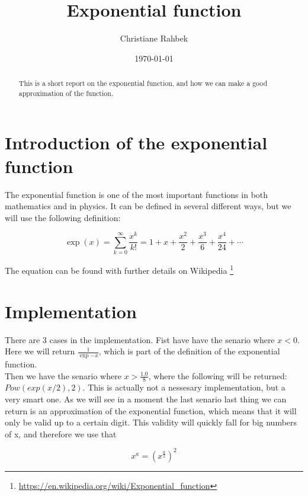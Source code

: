 \documentclass[twocolumn, a4paper]{article}
\begin{document}
\title{Exponential function}
\author{Christiane Rahbek}
\date{\today}

\maketitle

\begin{abstract}
This is a short report on the exponential function, and how we can make a good approximation of the function.
\end{abstract}

\section{Introduction of the exponential function}
The exponential function is one of the most important functions in both mathematics and in physics. It can be defined in several different ways, but we will use the following definition:

\begin{equation} \label{eq:exp}
	\exp(x) = \sum_{k = 0}^{\infty} \frac{x^k}{k!} = 1 + x + \frac{x^2}{2} + \frac{x^3}{6} + \frac{x^4}{24} + \cdots
\end{equation}

The equation can be found with further details on Wikipedia \footnote{\url{https://en.wikipedia.org/wiki/Exponential_function}}

\section{Implementation}

There are 3 cases in the implementation. Fist have have the senario where $x < 0$.
Here we will return $\frac{1}{\exp{-x}}$, which is part of the definition of the exponential function. \\
Then we have the senario where $x > \frac{1.0}{8}$, where the following will be returned: $Pow(exp(x/2), 2)$.
This is actually not a nessesary implementation, but a very smart one. As we will see in a moment the last senario last thing we can return is an approximation of the exponential function, which means that it will only be valid up to a certain digit. This validity will quickly fall for big numbers of x, and therefore we use that

\begin{equation}
 x^a = \left(x^{\frac{a}{2}}\right)^2
\end{equation}
\end{document}
